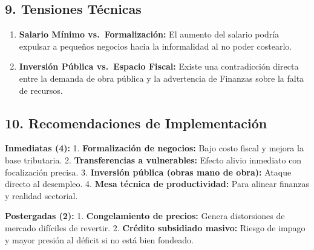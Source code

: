 \documentclass[12pt,spanish]{article}
\providecommand{\tightlist}{%
  \setlength{\itemsep}{0pt}\setlength{\parskip}{0pt}}
\begin{document}
\subsection{9. Tensiones Técnicas}\label{tensiones-tuxe9cnicas}

\begin{enumerate}
\def\labelenumi{\arabic{enumi}.}
\tightlist
\item
  \textbf{Salario Mínimo vs.~Formalización:} El aumento del salario
  podría expulsar a pequeños negocios hacia la informalidad al no poder
  costearlo.
\item
  \textbf{Inversión Pública vs.~Espacio Fiscal:} Existe una
  contradicción directa entre la demanda de obra pública y la
  advertencia de Finanzas sobre la falta de recursos.
\end{enumerate}

\subsection{10. Recomendaciones de
Implementación}\label{recomendaciones-de-implementaciuxf3n}

\textbf{Inmediatas (4):} 1. \textbf{Formalización de negocios:} Bajo
costo fiscal y mejora la base tributaria. 2. \textbf{Transferencias a
vulnerables:} Efecto alivio inmediato con focalización precisa. 3.
\textbf{Inversión pública (obras mano de obra):} Ataque directo al
desempleo. 4. \textbf{Mesa técnica de productividad:} Para alinear
finanzas y realidad sectorial.

\textbf{Postergadas (2):} 1. \textbf{Congelamiento de precios:} Genera
distorsiones de mercado difíciles de revertir. 2. \textbf{Crédito
subsidiado masivo:} Riesgo de impago y mayor presión al déficit si no
está bien fondeado.
\end{document}
